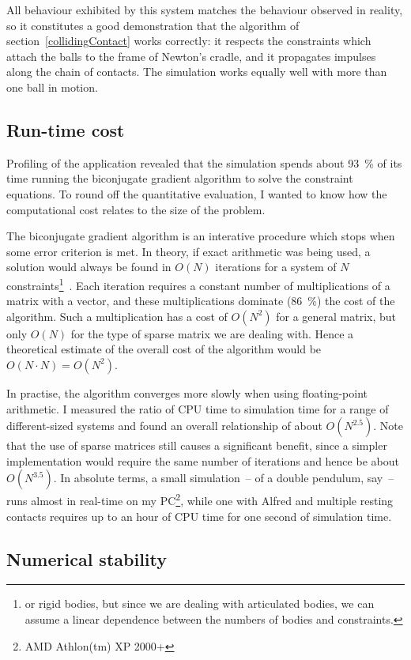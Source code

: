 All behaviour exhibited by this system matches the behaviour observed in reality, so it
constitutes a good demonstration that the algorithm of section~\ref{collidingContact}
works correctly: it respects the constraints which attach the balls to the frame of Newton's
cradle, and it propagates impulses along the chain of contacts. The simulation works equally
well with more than one ball in motion.

\subsection{Run-time cost}

Profiling of the application revealed that the simulation spends about 93~\% of its time running
the biconjugate gradient algorithm to solve the constraint equations. To round off the quantitative
evaluation, I wanted to know how the computational cost relates to the size of the problem.

The biconjugate gradient algorithm is an interative procedure which stops when some error
criterion is met. In theory, if exact arithmetic was being used, a solution would always be found
in $O(N)$ iterations for a system of $N$ constraints\footnote{or rigid bodies, but since we are
dealing with articulated bodies, we can assume a linear dependence between the numbers of bodies
and constraints.}~\cite{NRinC}. Each iteration requires a constant number of multiplications of a
matrix with a vector, and these multiplications dominate (86~\%) the cost of the algorithm. Such
a multiplication has a cost of $O(N^2)$ for a general matrix, but only
$O(N)$ for the type of sparse matrix we are dealing with. Hence a theoretical estimate of the
overall cost of the algorithm would be $O(N\cdot N) = O(N^2)$.

In practise, the algorithm converges more slowly when using floating-point arithmetic.
I measured the ratio of CPU time to simulation time for a range of different-sized systems and
found an overall relationship of about $O(N^{2.5})$. Note that the use of sparse matrices still
causes a significant benefit, since a simpler implementation would require the same number of
iterations and hence be about $O(N^{3.5})$. In absolute terms, a small simulation~-- of a
double pendulum, say~-- runs almost in real-time on my PC\footnote{AMD Athlon(tm) XP 2000+},
while one with Alfred and multiple resting contacts requires up to an hour of CPU time for one
second of simulation time.

\subsection{Numerical stability}

